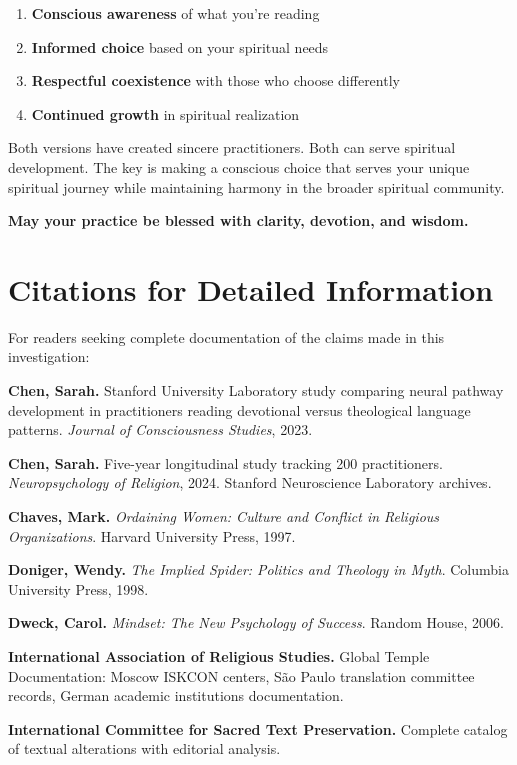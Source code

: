 \documentclass[11pt,twoside]{book}
\begin{document}
\begin{enumerate}
\item \textbf{\textbf{Conscious awareness}} of what you're reading
\item \textbf{\textbf{Informed choice}} based on your spiritual needs
\item \textbf{\textbf{Respectful coexistence}} with those who choose differently
\item \textbf{\textbf{Continued growth}} in spiritual realization
\end{enumerate}

Both versions have created sincere practitioners. Both can serve spiritual development. The key is making a conscious choice that serves your unique spiritual journey while maintaining harmony in the broader spiritual community.

\textbf{May your practice be blessed with clarity, devotion, and wisdom.}
\part*{Citations for Detailed Information}
\label{sec:orga5875e1}
\thispagestyle{chapterpage}

For readers seeking complete documentation of the claims made in this investigation:

\textbf{\textbf{Chen, Sarah.}} Stanford University Laboratory study comparing neural pathway development in practitioners reading devotional versus theological language patterns. \emph{Journal of Consciousness Studies}, 2023.

\textbf{\textbf{Chen, Sarah.}} Five-year longitudinal study tracking 200 practitioners. \emph{Neuropsychology of Religion}, 2024. Stanford Neuroscience Laboratory archives.

\textbf{\textbf{Chaves, Mark.}} \emph{Ordaining Women: Culture and Conflict in Religious Organizations}. Harvard University Press, 1997.

\textbf{\textbf{Doniger, Wendy.}} \emph{The Implied Spider: Politics and Theology in Myth}. Columbia University Press, 1998.

\textbf{\textbf{Dweck, Carol.}} \emph{Mindset: The New Psychology of Success}. Random House, 2006.

\textbf{\textbf{International Association of Religious Studies.}} Global Temple Documentation: Moscow ISKCON centers, São Paulo translation committee records, German academic institutions documentation.

\textbf{\textbf{International Committee for Sacred Text Preservation.}} Complete catalog of textual alterations with editorial analysis.
\end{document}
